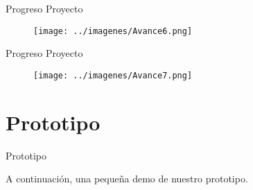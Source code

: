\documentclass{beamer}
\begin{document}
\begin{frame}{Progreso Proyecto}

\begin{figure}
\centering
\texttt{[image: ../imagenes/Avance6.png]}
\end{figure}

\end{frame}

\begin{frame}{Progreso Proyecto}

\begin{figure}
\centering
\texttt{[image: ../imagenes/Avance7.png]}
\end{figure}

\end{frame}


\section{Prototipo}

\begin{frame}{Prototipo}

A continuación, una pequeña demo de nuestro prototipo.

\end{frame}
\end{document}
